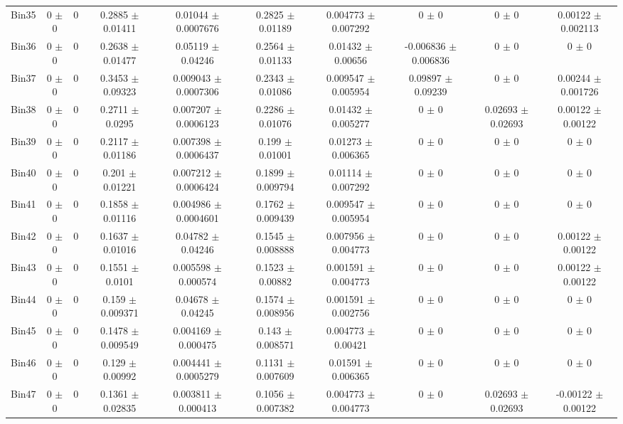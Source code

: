 \begin{tabular}{@{\extracolsep{4pt}}lccccccccc@{}}
     Bin35 & 0 $\pm$ 0 & 0 & 0.2885 $\pm$ 0.01411 & 0.01044 $\pm$ 0.0007676 & 0.2825 $\pm$ 0.01189 & 0.004773 $\pm$ 0.007292 & 0 $\pm$ 0 & 0 $\pm$ 0 & 0.00122 $\pm$ 0.002113 \\ 
     Bin36 & 0 $\pm$ 0 & 0 & 0.2638 $\pm$ 0.01477 & 0.05119 $\pm$ 0.04246 & 0.2564 $\pm$ 0.01133 & 0.01432 $\pm$ 0.00656 & -0.006836 $\pm$ 0.006836 & 0 $\pm$ 0 & 0 $\pm$ 0 \\ 
     Bin37 & 0 $\pm$ 0 & 0 & 0.3453 $\pm$ 0.09323 & 0.009043 $\pm$ 0.0007306 & 0.2343 $\pm$ 0.01086 & 0.009547 $\pm$ 0.005954 & 0.09897 $\pm$ 0.09239 & 0 $\pm$ 0 & 0.00244 $\pm$ 0.001726 \\ 
     Bin38 & 0 $\pm$ 0 & 0 & 0.2711 $\pm$ 0.0295 & 0.007207 $\pm$ 0.0006123 & 0.2286 $\pm$ 0.01076 & 0.01432 $\pm$ 0.005277 & 0 $\pm$ 0 & 0.02693 $\pm$ 0.02693 & 0.00122 $\pm$ 0.00122 \\ 
     Bin39 & 0 $\pm$ 0 & 0 & 0.2117 $\pm$ 0.01186 & 0.007398 $\pm$ 0.0006437 & 0.199 $\pm$ 0.01001 & 0.01273 $\pm$ 0.006365 & 0 $\pm$ 0 & 0 $\pm$ 0 & 0 $\pm$ 0 \\ 
     Bin40 & 0 $\pm$ 0 & 0 & 0.201 $\pm$ 0.01221 & 0.007212 $\pm$ 0.0006424 & 0.1899 $\pm$ 0.009794 & 0.01114 $\pm$ 0.007292 & 0 $\pm$ 0 & 0 $\pm$ 0 & 0 $\pm$ 0 \\ 
     Bin41 & 0 $\pm$ 0 & 0 & 0.1858 $\pm$ 0.01116 & 0.004986 $\pm$ 0.0004601 & 0.1762 $\pm$ 0.009439 & 0.009547 $\pm$ 0.005954 & 0 $\pm$ 0 & 0 $\pm$ 0 & 0 $\pm$ 0 \\ 
     Bin42 & 0 $\pm$ 0 & 0 & 0.1637 $\pm$ 0.01016 & 0.04782 $\pm$ 0.04246 & 0.1545 $\pm$ 0.008888 & 0.007956 $\pm$ 0.004773 & 0 $\pm$ 0 & 0 $\pm$ 0 & 0.00122 $\pm$ 0.00122 \\ 
     Bin43 & 0 $\pm$ 0 & 0 & 0.1551 $\pm$ 0.0101 & 0.005598 $\pm$ 0.000574 & 0.1523 $\pm$ 0.00882 & 0.001591 $\pm$ 0.004773 & 0 $\pm$ 0 & 0 $\pm$ 0 & 0.00122 $\pm$ 0.00122 \\ 
     Bin44 & 0 $\pm$ 0 & 0 & 0.159 $\pm$ 0.009371 & 0.04678 $\pm$ 0.04245 & 0.1574 $\pm$ 0.008956 & 0.001591 $\pm$ 0.002756 & 0 $\pm$ 0 & 0 $\pm$ 0 & 0 $\pm$ 0 \\ 
     Bin45 & 0 $\pm$ 0 & 0 & 0.1478 $\pm$ 0.009549 & 0.004169 $\pm$ 0.000475 & 0.143 $\pm$ 0.008571 & 0.004773 $\pm$ 0.00421 & 0 $\pm$ 0 & 0 $\pm$ 0 & 0 $\pm$ 0 \\ 
     Bin46 & 0 $\pm$ 0 & 0 & 0.129 $\pm$ 0.00992 & 0.004441 $\pm$ 0.0005279 & 0.1131 $\pm$ 0.007609 & 0.01591 $\pm$ 0.006365 & 0 $\pm$ 0 & 0 $\pm$ 0 & 0 $\pm$ 0 \\ 
     Bin47 & 0 $\pm$ 0 & 0 & 0.1361 $\pm$ 0.02835 & 0.003811 $\pm$ 0.000413 & 0.1056 $\pm$ 0.007382 & 0.004773 $\pm$ 0.004773 & 0 $\pm$ 0 & 0.02693 $\pm$ 0.02693 & -0.00122 $\pm$ 0.00122 \\ 

\end{tabular}
